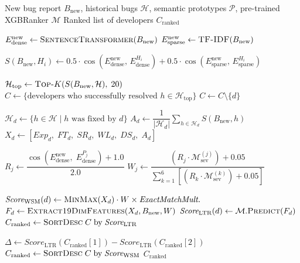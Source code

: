 \documentclass[sigconf,review,anonymous]{acmart}
\begin{document}
\begin{algorithm}[t]
\caption{Automated Bug Assignment Pipeline}
\label{alg:pipeline}
\begin{algorithmic}[1]
\Require New bug report $B_{\text{new}}$, historical bugs $\mathcal{H}$,
         semantic prototypes $\mathcal{P}$, pre-trained XGBRanker $\mathcal{M}$
\Ensure  Ranked list of developers $C_{\text{ranked}}$

\State $E^{\text{new}}_{\text{dense}}  \leftarrow \textsc{SentenceTransformer}(B_{\text{new}})$
\State $E^{\text{new}}_{\text{sparse}} \leftarrow \textsc{TF-IDF}(B_{\text{new}})$

  \State $S(B_{\text{new}}, H_i) \leftarrow
    0.5\cdot\cos\!\left(E^{\text{new}}_{\text{dense}},\, E^{H_i}_{\text{dense}}\right)
    + 0.5\cdot\cos\!\left(E^{\text{new}}_{\text{sparse}},\, E^{H_i}_{\text{sparse}}\right)$
\EndFor

\State $\mathcal{H}_{\text{top}} \leftarrow \textsc{Top-}K\!\left(S(B_{\text{new}}, \mathcal{H}),\; 20\right)$
\State $C \leftarrow \{\text{developers who successfully resolved } h \in \mathcal{H}_{\text{top}}\}$
    \State $C \leftarrow C \setminus \{d\}$
  \EndIf
\EndFor

  \State $\mathcal{H}_d \leftarrow \{h \in \mathcal{H} \mid h \text{ was fixed by } d\}$
  \State $A_d \leftarrow \dfrac{1}{|\mathcal{H}_d|}\displaystyle\sum_{h \in \mathcal{H}_d} S(B_{\text{new}}, h)$
  \State $X_d \leftarrow [\mathit{Exp}_d,\; FT_d,\; SR_d,\; WL_d,\; DS_d,\; A_d]$
\EndFor

  \State $R_j \leftarrow \dfrac{\cos\!\left(E^{\text{new}}_{\text{dense}},\; E^{P_j}_{\text{dense}}\right) + 1.0}{2.0}$
  \State $W_j \leftarrow \dfrac{\left(R_j \cdot \mathcal{M}^{(j)}_{\text{sev}}\right) + 0.05}
                               {\displaystyle\sum_{k=1}^{6}\left[\left(R_k \cdot \mathcal{M}^{(k)}_{\text{sev}}\right) + 0.05\right]}$
\EndFor

  \State $\textit{Score}_{\text{WSM}}(d) \leftarrow \textsc{MinMax}(X_d)\cdot W \times \textit{ExactMatchMult.}$
  \State $F_d \leftarrow \textsc{Extract19DimFeatures}(X_d, B_{\text{new}}, W)$
  \State $\textit{Score}_{\text{LTR}}(d) \leftarrow \mathcal{M}.\textsc{Predict}(F_d)$
\EndFor
\State $C_{\text{ranked}} \leftarrow \textsc{SortDesc}\;C\;\text{by}\;\textit{Score}_{\text{LTR}}$

\State $\Delta \leftarrow \textit{Score}_{\text{LTR}}(C_{\text{ranked}}[1]) - \textit{Score}_{\text{LTR}}(C_{\text{ranked}}[2])$
  \State $C_{\text{ranked}} \leftarrow \textsc{SortDesc}\;C\;\text{by}\;\textit{Score}_{\text{WSM}}$
\EndIf
\State \Return $C_{\text{ranked}}$
\end{algorithmic}
\end{algorithm}
\end{document}
